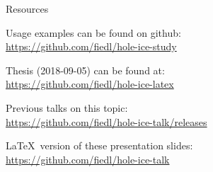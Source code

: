 
\begin{frame}{Resources}
  \begin{center}
    Usage examples can be found on github: \\ \vspace{0.2cm}
    \url{https://github.com/fiedl/hole-ice-study}

    \vspace{1cm}

    Thesis (2018-09-05) can be found at: \\ \vspace{0.2cm}
    \url{https://github.com/fiedl/hole-ice-latex}

    \vspace{1cm}

    Previous talks on this topic: \\ \vspace{0.2cm}
    \url{https://github.com/fiedl/hole-ice-talk/releases}

    \vspace{1cm}

    \LaTeX\ version of these presentation slides: \\ \vspace{0.2cm}
    \url{https://github.com/fiedl/hole-ice-talk}
  \end{center}
\end{frame}

